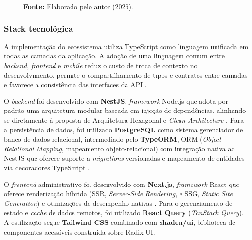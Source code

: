 \documentclass[12pt,a4paper]{article}
\begin{document}
\begin{figure}[H]
\caption*{\textbf{Fonte:} Elaborado pelo autor (2026).}
\end{figure}

\subsubsection{Stack tecnológica}

A implementação do ecossistema utiliza TypeScript como linguagem unificada em todas as camadas da
aplicação. A adoção de uma linguagem comum entre \textit{backend}, \textit{frontend} e
\textit{mobile} reduz o custo de troca de contexto no desenvolvimento, permite o compartilhamento de
tipos e contratos entre camadas e favorece a consistência das interfaces da API
\parencite{bierman2014}.

O \textit{backend} foi desenvolvido com \textbf{NestJS}, \textit{framework} Node.js que adota por
padrão uma arquitetura modular baseada em injeção de dependências, alinhando-se diretamente à
proposta de Arquitetura Hexagonal e \textit{Clean Architecture} \parencite{nestjs2023}. Para a
persistência de dados, foi utilizado \textbf{PostgreSQL} como sistema gerenciador de banco de dados
relacional, intermediado pelo \textbf{TypeORM}, ORM (\textit{Object-Relational Mapping}, mapeamento
objeto-relacional) com integração nativa ao NestJS que oferece suporte a \textit{migrations}
versionadas e mapeamento de entidades via decoradores TypeScript \parencite{typeorm2023}.

O \textit{frontend} administrativo foi desenvolvido com \textbf{Next.js}, \textit{framework} React
que oferece renderização híbrida (SSR, \textit{Server-Side Rendering}, e SSG, \textit{Static Site
Generation}) e otimizações de desempenho nativas \parencite{nextjs2023}.
Para o gerenciamento de estado e \textit{cache} de dados remotos, foi utilizado \textbf{React Query}
(\textit{TanStack Query}). A estilização segue \textbf{Tailwind CSS} combinado com
\textbf{shadcn/ui}, biblioteca de componentes acessíveis construída sobre Radix UI.
\end{document}
